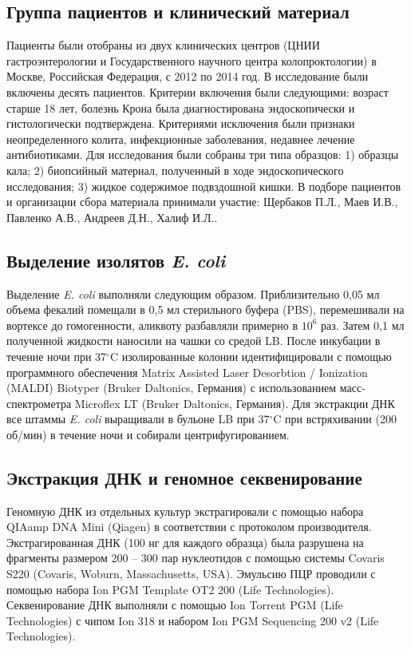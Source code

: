 \subsection{Группа пациентов и клинический материал}
Пациенты были отобраны из двух клинических центров (ЦНИИ гастроэнтерологии и Государственного научного центра колопроктологии) в Москве, Российская Федерация, с 2012 по 2014 год. В исследование были включены десять пациентов. Критерии включения были следующими: возраст старше 18 лет, болезнь Крона была диагностирована эндоскопически и гистологически подтверждена. Критериями исключения были признаки неопределенного колита, инфекционные заболевания, недавнее лечение антибиотиками. 
Для исследования были собраны три типа образцов: 1) образцы кала; 2) биопсийный материал, полученный в ходе эндоскопического исследования; 3) жидкое содержимое подвздошной кишки. В подборе пациентов и организации сбора материала принимали участие: Щербаков П.Л., Маев И.В., Павленко А.В., Андреев Д.Н., Халиф И.Л..

\subsection{Выделение изолятов \textit{E. coli}}

Выделение \textit{E. coli} выполняли следующим образом. Приблизительно 0,05 мл объема фекалий помещали в 0,5 мл стерильного буфера (PBS), перемешивали на вортексе до гомогенности, аликвоту разбавляли примерно в $10^6$ раз. Затем 0,1 мл полученной жидкости наносили на чашки со средой LB. После инкубации в течение ночи при 37$^\circ$C изолированные колонии идентифицировали с помощью программного обеспечения Matrix Assisted Laser Desorbtion / Ionization (MALDI) Biotyper (Bruker Daltonics, Германия) с использованием масс-спектрометра Microflex LT (Bruker Daltonics, Германия). Для экстракции ДНК все штаммы \textit{E. coli} выращивали в бульоне LB при 37$^\circ$C при встряхивании (200 об/мин) в течение ночи и собирали центрифугированием. 

\subsection{Экстракция ДНК и геномное секвенирование}

Геномную ДНК из отдельных культур экстрагировали с помощью набора QIAamp DNA Mini (Qiagen) в соответствии с протоколом производителя. Экстрагированная ДНК (100 нг для каждого образца) была разрушена на фрагменты размером 200 – 300 пар нуклеотидов с помощью системы Covaris S220 (Covaris, Woburn, Massachusetts, USA). Эмульсию ПЦР проводили с помощью набора Ion PGM Template OT2 200 (Life Technologies). Секвенирование ДНК выполняли с помощью Ion Torrent PGM (Life Technologies) с чипом Ion 318 и набором Ion PGM Sequencing 200 v2 (Life Technologies). 

